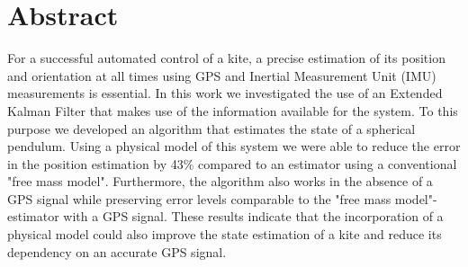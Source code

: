 \chapter*{Abstract}

For a successful automated control of a kite, a precise estimation of its position and orientation at all times using GPS and Inertial Measurement Unit (IMU) measurements is essential. In this work we investigated the use of an Extended Kalman Filter that makes use of the information available for the system. To this purpose we developed an algorithm that estimates the state of a spherical pendulum. Using a physical model of this system we were able to reduce the error in the position estimation by 43\% compared to an estimator using a conventional "free mass model". Furthermore, the algorithm also works in the absence of a GPS signal while preserving error levels comparable to the "free mass model"-estimator with a GPS signal. These results indicate that the incorporation of a physical model could also improve the state estimation of a kite and reduce its dependency on an accurate GPS signal. 















